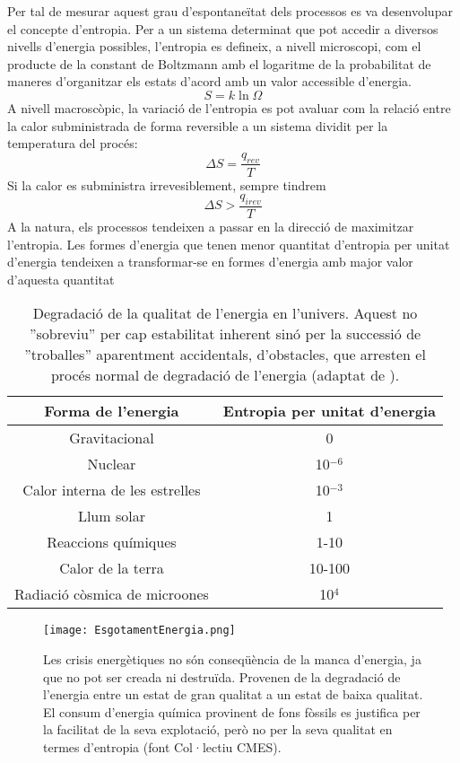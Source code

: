 Per tal de mesurar aquest grau d'espontaneïtat dels processos es va desenvolupar el concepte d'entropia. Per a un sistema determinat que pot accedir a diversos nivells d'energia possibles, l'entropia es defineix, a nivell microscopi, com el producte de la constant de Boltzmann amb el logaritme de la probabilitat de maneres d'organitzar els estats d'acord amb un valor accessible d'energia.
\[
S=k \ln \Omega
\]
A nivell macroscòpic, la variació de l'entropia es pot avaluar com la relació entre la calor subministrada de forma reversible a un sistema dividit per la temperatura del procés:
\[
\Delta S = \frac{q_{rev}}{T}
\]
Si la calor es subministra irrevesiblement, sempre tindrem 
\[
\Delta S > \frac{q_{irev}}{T}
\]
A la natura, els processos tendeixen a passar en la direcció de maximitzar l'entropia.
Les formes d'energia que tenen menor quantitat d'entropia per unitat d'energia tendeixen a transformar-se en formes d'energia amb major valor d'aquesta quantitat

\begin{table}[h!]
  \begin{center}
    \caption{Degradació de la qualitat de l'energia en l'univers. Aquest no ''sobreviu'' per cap estabilitat inherent sinó per la successió de ''troballes'' aparentment accidentals, d'obstacles, que arresten el procés normal de degradació de l'energia (adaptat de \cite{dyson_energy_1971}).}
    \label{tab:DegradacioEnergia}
       \begin{tabular}{cc}
Forma de l'energia & Entropia per unitat d'energia\\
\hline
Gravitacional & 0 \\
Nuclear & 10$^{-6}$ \\
Calor interna de les estrelles & 10$^{-3}$ \\
Llum solar & 1 \\
Reaccions químiques & 1-10 \\
Calor de la terra & 10-100 \\
Radiació còsmica de microones & 10$^4$ \\
\hline
       \end{tabular}
   \end{center}
\end{table}

\begin{figure}[h]
\centering
\texttt{[image: EsgotamentEnergia.png]}
\caption{Les crisis energètiques no són conseqüència de la manca d'energia, ja que no pot ser creada ni destruïda. Provenen de la degradació de l'energia entre un estat de gran qualitat a un estat de baixa qualitat. El consum d'energia química provinent de fons fòssils es justifica per la facilitat de la seva explotació, però no per la seva qualitat en termes d'entropia (font Col·lectiu CMES).}
\label{fig:EsgotamentEnergia}
\end{figure}


